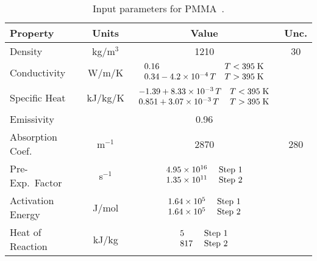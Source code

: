 \begin{table}[!h]
\caption[NIST PMMA properties]{Input parameters for PMMA~\cite{Fiola:FSJ2021}.}
\begin{center}
\begin{tabular}{|l|c|c|c|}
\hline
Property                    & Units         & Value                                                                                                                                        & Unc.           \\ \hline \hline
Density                     & kg/m$^3$      & 1210                                                                                                                                         & 30             \\ \hline
Conductivity                & W/m/K         & $\begin{array}{ll} 0.16  & T<395 \; \hbox{K} \\  0.34 - 4.2 \times 10^{-4} \, T  & T>395 \; \hbox{K} \end{array}$                            &                \\ \hline
Specific Heat               & kJ/kg/K       & $\begin{array}{ll} -1.39+ 8.33 \times 10^{-3} \, T & T<395 \; \hbox{K} \\ 0.851 + 3.07 \times 10^{-3} \, T & T>395 \; \hbox{K} \end{array}$  &                \\ \hline
Emissivity                  &               & 0.96                                                                                                                                         &                \\ \hline
Absorption Coef.            & m$^{-1}$      & 2870                                                                                                                                         & 280            \\ \hline
Pre-Exp.~Factor             & s$^{-1}$      & $\begin{array}{ll} 4.95 \times 10^{16} & \hbox{ Step 1} \\ 1.35 \times 10^{11} & \hbox{ Step 2} \end{array}$                                 &                \\ \hline 
Activation Energy           & J/mol         & $\begin{array}{ll} 1.64 \times 10^{5}  & \hbox{ Step 1} \\ 1.64 \times 10^{5}  & \hbox{ Step 2} \end{array}$                                 &                \\ \hline
Heat of Reaction            & kJ/kg         & $\begin{array}{ll} 5                   & \hbox{ Step 1} \\ 817                 & \hbox{ Step 2} \end{array}$                                 &                \\ \hline
\end{tabular}
\end{center}
\label{NIST_PMMA_Properties}
\end{table}

